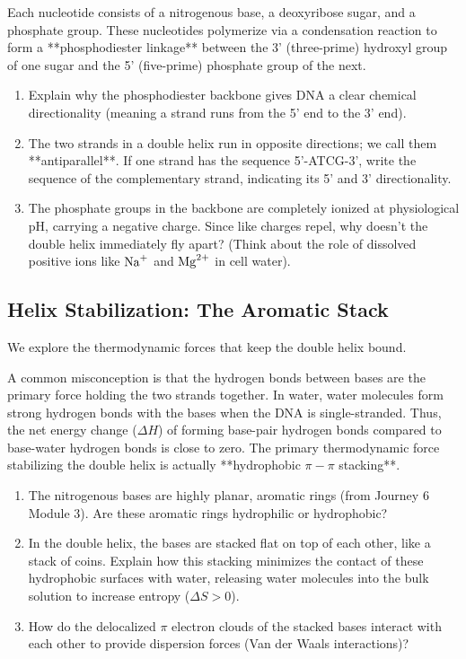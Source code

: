 \documentclass[12pt, a4paper]{book}
\begin{document}
\begin{explobox}
Each nucleotide consists of a nitrogenous base, a deoxyribose sugar, and a phosphate group.
These nucleotides polymerize via a condensation reaction to form a **phosphodiester linkage** between the 3' (three-prime) hydroxyl group of one sugar and the 5' (five-prime) phosphate group of the next.
\begin{enumerate}[label=(\alph*), leftmargin=*]
  \item Explain why the phosphodiester backbone gives DNA a clear chemical directionality (meaning a strand runs from the 5' end to the 3' end).
  \item The two strands in a double helix run in opposite directions; we call them **antiparallel**.
        If one strand has the sequence 5'-ATCG-3', write the sequence of the complementary strand, indicating its 5' and 3' directionality.
  \item The phosphate groups in the backbone are completely ionized at physiological pH, carrying a negative charge.
        Since like charges repel, why doesn't the double helix immediately fly apart? (Think about the role of dissolved positive ions like $\ce{Na+}$ and $\ce{Mg^2+}$ in cell water).
\end{enumerate}
\end{explobox}

\subsection{Helix Stabilization: The Aromatic Stack}

We explore the thermodynamic forces that keep the double helix bound.

\begin{explobox}
A common misconception is that the hydrogen bonds between bases are the primary force holding the two strands together.
In water, water molecules form strong hydrogen bonds with the bases when the DNA is single-stranded. Thus, the net energy change ($\Delta H$) of forming base-pair hydrogen bonds compared to base-water hydrogen bonds is close to zero.
\problem The primary thermodynamic force stabilizing the double helix is actually **hydrophobic $\pi-\pi$ stacking**.
\begin{enumerate}[label=(\alph*), leftmargin=*]
  \item The nitrogenous bases are highly planar, aromatic rings (from Journey 6 Module 3).
        Are these aromatic rings hydrophilic or hydrophobic?
  \item In the double helix, the bases are stacked flat on top of each other, like a stack of coins.
        Explain how this stacking minimizes the contact of these hydrophobic surfaces with water, releasing water molecules into the bulk solution to increase entropy ($\Delta S > 0$).
  \item How do the delocalized $\pi$ electron clouds of the stacked bases interact with each other to provide dispersion forces (Van der Waals interactions)?
\end{enumerate}
\end{explobox}
\end{document}
